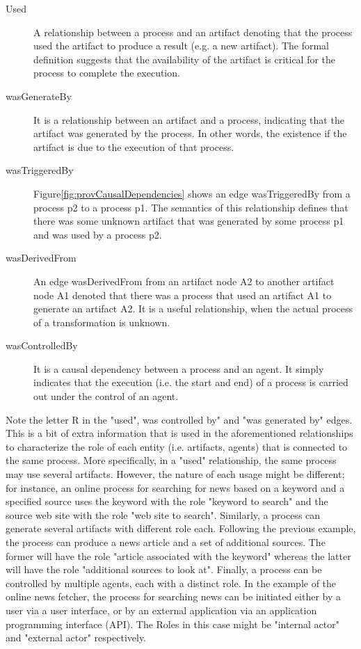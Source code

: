 \begin{description}
  \item[Used]
        A relationship between a process and an artifact denoting that the process used the artifact to produce a result (e.g. a new artifact). The formal definition suggests that the availability of the artifact is critical for the process to complete the execution.
  \item[wasGenerateBy]
        It is a relationship between an artifact and a process, indicating that the artifact was generated by the process. In other words, the existence if the artifact is due to the execution of that process.
  \item[wasTriggeredBy]
        Figure\ref{fig:provCausalDependencies} shows an edge wasTriggeredBy from a process p2 to a process p1. The semantics of this relationship defines that there was some unknown artifact that was generated by some process p1 and was used by a process p2.
  \item[wasDerivedFrom]
        An edge wasDerivedFrom from an artifact node A2 to another artifact node A1 denoted that there was a process that used an artifact A1 to generate an artifact A2. It is a useful relationship, when the actual process of a transformation is unknown.
  \item[wasControlledBy]
        It is a causal dependency between a process and an agent. It simply indicates that the execution (i.e. the start and end) of a process is carried out under the control of an agent.
\end{description}

Note the letter R in the "used", was controlled by" and "was generated by" edges. This is a bit of extra information that is used in the aforementioned relationships to characterize the role of each entity (i.e. artifacts, agents) that is connected to the same process. More specifically, in a "used" relationship, the same process may use several artifacts. However, the nature of each usage might be different; for instance, an online process for searching for news based on a keyword and a specified source uses the keyword with the role "keyword to search" and the source web site with the role "web site to search". Similarly, a process can generate several artifacts with different role each. Following the previous example, the process can produce a news article and a set of additional sources. The former will have the role "article associated with the keyword" whereas the latter will have the role "additional sources to look at". Finally, a process can be controlled by multiple agents, each with a distinct role. In the example of the online news fetcher, the process for searching news can be initiated either by a user via a user interface, or by an external application via an application programming interface (API). The Roles in this case might be "internal actor" and "external actor" respectively.

